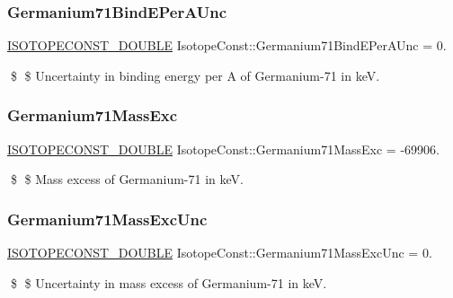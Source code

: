 \subsubsection{\texorpdfstring{Germanium71\+Bind\+E\+Per\+A\+Unc}{Germanium71BindEPerAUnc}}
{\footnotesize\ttfamily \mbox{\hyperlink{group___isotope_const-_macros_ga8f45a7272ce02c0b4c65c44636ed719a}{I\+S\+O\+T\+O\+P\+E\+C\+O\+N\+S\+T\+\_\+\+D\+O\+U\+B\+LE}} Isotope\+Const\+::\+Germanium71\+Bind\+E\+Per\+A\+Unc = 0.}

\$ \$ Uncertainty in binding energy per A of Germanium-\/71 in keV. \mbox{\label{group___isotope_const-_germanium-_ge71_ga12a415c1f110b59bdbc36ff8e4513b9d}} 
\subsubsection{\texorpdfstring{Germanium71\+Mass\+Exc}{Germanium71MassExc}}
{\footnotesize\ttfamily \mbox{\hyperlink{group___isotope_const-_macros_ga8f45a7272ce02c0b4c65c44636ed719a}{I\+S\+O\+T\+O\+P\+E\+C\+O\+N\+S\+T\+\_\+\+D\+O\+U\+B\+LE}} Isotope\+Const\+::\+Germanium71\+Mass\+Exc = -\/69906.}

\$ \$ Mass excess of Germanium-\/71 in keV. \mbox{\label{group___isotope_const-_germanium-_ge71_gaf17a9ab1b12c36789b78884d2d148377}} 
\subsubsection{\texorpdfstring{Germanium71\+Mass\+Exc\+Unc}{Germanium71MassExcUnc}}
{\footnotesize\ttfamily \mbox{\hyperlink{group___isotope_const-_macros_ga8f45a7272ce02c0b4c65c44636ed719a}{I\+S\+O\+T\+O\+P\+E\+C\+O\+N\+S\+T\+\_\+\+D\+O\+U\+B\+LE}} Isotope\+Const\+::\+Germanium71\+Mass\+Exc\+Unc = 0.}

\$ \$ Uncertainty in mass excess of Germanium-\/71 in keV. \mbox{\label{group___isotope_const-_germanium-_ge71_ga6968cea03e392f7c28d815e087df08ba}} 
